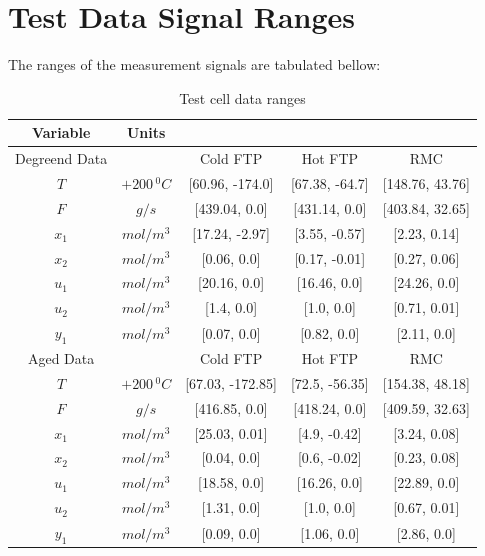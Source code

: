 \section{Test Data Signal Ranges}
The ranges of the measurement signals are tabulated bellow:
\begin{table}[H]
\centering
\begin{tabular}{c c c c c}
\hline \hline
Variable & Units & & & \\
\hline \hline
Degreend Data & & Cold FTP & Hot FTP & RMC\\ \hline
$T$   & $+200 \, ^0C$ & [60.96, -174.0] & [67.38, -64.7] & [148.76, 43.76]
\\
$F$   & $g/s$ & [439.04, 0.0]& [431.14, 0.0]& [403.84, 32.65]
\\
$x_1$ & $mol/m^3$ & [17.24, -2.97] &  [3.55, -0.57]& [2.23, 0.14]
\\
$x_2$ & $mol/m^3$ & [0.06, 0.0] & [0.17, -0.01] & [0.27, 0.06]
\\
$u_1$ & $mol/m^3$ & [20.16, 0.0] & [16.46, 0.0] & [24.26, 0.0]
\\
$u_2$ & $mol/m^3$ & [1.4, 0.0] & [1.0, 0.0] & [0.71, 0.01]
\\
$y_1$ & $mol/m^3$ & [0.07, 0.0]& [0.82, 0.0]& [2.11, 0.0]
\\
\hline
Aged Data & &Cold FTP & Hot FTP & RMC\\ \hline
$T$   & $+200 \, ^0C$ & [67.03, -172.85]& [72.5, -56.35]& [154.38, 48.18]
\\
$F$   & $g/s$ & [416.85, 0.0]& [418.24, 0.0]& [409.59, 32.63]
\\
$x_1$ & $mol/m^3$ & [25.03, 0.01] & [4.9, -0.42] & [3.24, 0.08]
\\
$x_2$ & $mol/m^3$ & [0.04, 0.0] & [0.6, -0.02] & [0.23, 0.08]
\\
$u_1$ & $mol/m^3$ &  [18.58, 0.0]& [16.26, 0.0] & [22.89, 0.0]
\\
$u_2$ & $mol/m^3$ & [1.31, 0.0] & [1.0, 0.0] & [0.67, 0.01]
\\
$y_1$ & $mol/m^3$ & [0.09, 0.0]& [1.06, 0.0]& [2.86, 0.0]
\\
\hline \hline
\end{tabular}
\caption{Test cell data ranges}
\end{table}


